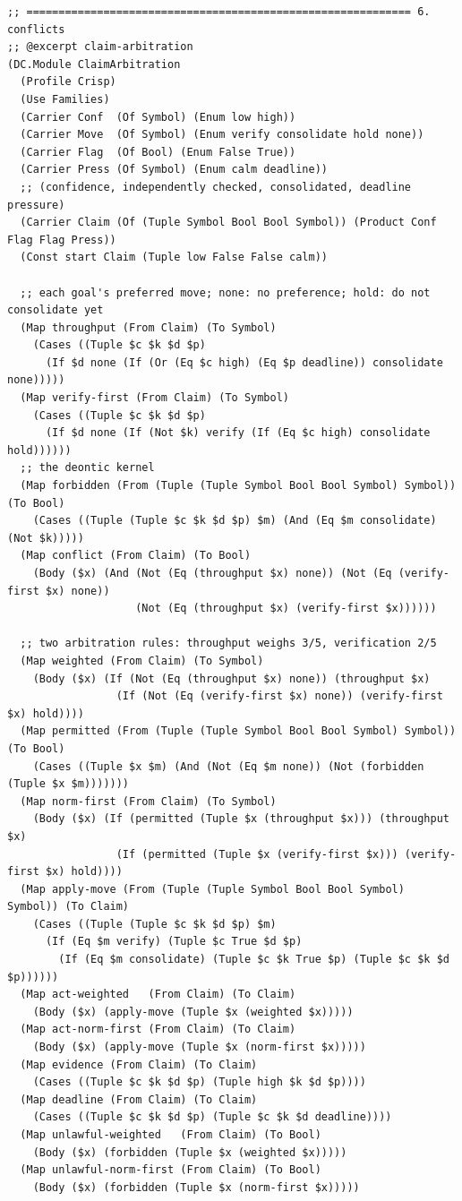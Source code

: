 \documentclass[11pt]{article}
\theoremstyle{definition}
\theoremstyle{plain}
\begin{document}
\begin{lstlisting}[style=mettafull]
;; ============================================================ 6. conflicts
;; @excerpt claim-arbitration
(DC.Module ClaimArbitration
  (Profile Crisp)
  (Use Families)
  (Carrier Conf  (Of Symbol) (Enum low high))
  (Carrier Move  (Of Symbol) (Enum verify consolidate hold none))
  (Carrier Flag  (Of Bool) (Enum False True))
  (Carrier Press (Of Symbol) (Enum calm deadline))
  ;; (confidence, independently checked, consolidated, deadline pressure)
  (Carrier Claim (Of (Tuple Symbol Bool Bool Symbol)) (Product Conf Flag Flag Press))
  (Const start Claim (Tuple low False False calm))

  ;; each goal's preferred move; none: no preference; hold: do not consolidate yet
  (Map throughput (From Claim) (To Symbol)
    (Cases ((Tuple $c $k $d $p)
      (If $d none (If (Or (Eq $c high) (Eq $p deadline)) consolidate none)))))
  (Map verify-first (From Claim) (To Symbol)
    (Cases ((Tuple $c $k $d $p)
      (If $d none (If (Not $k) verify (If (Eq $c high) consolidate hold))))))
  ;; the deontic kernel
  (Map forbidden (From (Tuple (Tuple Symbol Bool Bool Symbol) Symbol)) (To Bool)
    (Cases ((Tuple (Tuple $c $k $d $p) $m) (And (Eq $m consolidate) (Not $k)))))
  (Map conflict (From Claim) (To Bool)
    (Body ($x) (And (Not (Eq (throughput $x) none)) (Not (Eq (verify-first $x) none))
                    (Not (Eq (throughput $x) (verify-first $x))))))

  ;; two arbitration rules: throughput weighs 3/5, verification 2/5
  (Map weighted (From Claim) (To Symbol)
    (Body ($x) (If (Not (Eq (throughput $x) none)) (throughput $x)
                 (If (Not (Eq (verify-first $x) none)) (verify-first $x) hold))))
  (Map permitted (From (Tuple (Tuple Symbol Bool Bool Symbol) Symbol)) (To Bool)
    (Cases ((Tuple $x $m) (And (Not (Eq $m none)) (Not (forbidden (Tuple $x $m)))))))
  (Map norm-first (From Claim) (To Symbol)
    (Body ($x) (If (permitted (Tuple $x (throughput $x))) (throughput $x)
                 (If (permitted (Tuple $x (verify-first $x))) (verify-first $x) hold))))
  (Map apply-move (From (Tuple (Tuple Symbol Bool Bool Symbol) Symbol)) (To Claim)
    (Cases ((Tuple (Tuple $c $k $d $p) $m)
      (If (Eq $m verify) (Tuple $c True $d $p)
        (If (Eq $m consolidate) (Tuple $c $k True $p) (Tuple $c $k $d $p))))))
  (Map act-weighted   (From Claim) (To Claim)
    (Body ($x) (apply-move (Tuple $x (weighted $x)))))
  (Map act-norm-first (From Claim) (To Claim)
    (Body ($x) (apply-move (Tuple $x (norm-first $x)))))
  (Map evidence (From Claim) (To Claim)
    (Cases ((Tuple $c $k $d $p) (Tuple high $k $d $p))))
  (Map deadline (From Claim) (To Claim)
    (Cases ((Tuple $c $k $d $p) (Tuple $c $k $d deadline))))
  (Map unlawful-weighted   (From Claim) (To Bool)
    (Body ($x) (forbidden (Tuple $x (weighted $x)))))
  (Map unlawful-norm-first (From Claim) (To Bool)
    (Body ($x) (forbidden (Tuple $x (norm-first $x)))))


\end{lstlisting}
\end{document}

